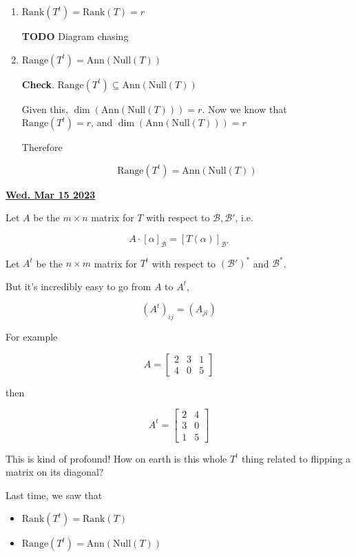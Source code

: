 \documentclass[12pt]{article}
\newcommand{\rank}{\mathrm{Rank}}
\def\Ann{\text{Ann}}
\def\B{\mathcal B}
\renewcommand{\date}[1]{\underline{\bf #1}}
\def\range{\text{Range}}
\def\Null{\text{Null}}
\newcommand{\TODO}{\color{red}\textbf{TODO}\color{black}}
\begin{document}
{\begin{enumerate}
        So what we have is that, if $g$ is in the Null Space of $T^t$, it also
        must be in the Annihilator of the Range of $T$.

      \item $\rank(T^t) = \rank(T) = r$ 

        \TODO{} Diagram chasing

      \item $\range(T^t) = \Ann(\Null(T))$

        {\bf Check}. $\range(T^t) \subseteq \Ann(\Null(T))$

        Given this, $\dim(\Ann(\Null(T))) = r$. Now we know that $\range(T^t) =
        r$, and $\dim(\Ann(\Null(T))) = r$

        Therefore

        \[
          \range(T^t) = \Ann(\Null(T))
        \]
    \end{enumerate}
  }

  \date{Wed. Mar 15 2023}

  Let $A$ be the $m \times n$ matrix for $T$ with respect to $\B, \B'$, i.e.

  \[
    A \cdot [\alpha]_{\B} = [T(\alpha)]_{\B'}
  \]

  Let $A^t$ be the $n \times m$ matrix for $T^t$ with respect to
  $\left(\B'\right)^*$ and $\B^*$.

  But it's incredibly easy to go from $A$ to $A^t$,

  \[
    \left(A^t\right)_{ij} = \left(A_{ji}\right)
  \]

  For example

  \[
    A = \begin{bmatrix}
      2 & 3 & 1 \\
      4 & 0 & 5
    \end{bmatrix}
  \]

  then

  \[
    A^t = \begin{bmatrix}
      2 & 4 \\
      3 & 0 \\
      1 & 5
    \end{bmatrix}
  \]

  This is kind of profound! How on earth is this whole $T^t$ thing related to
  flipping a matrix on its diagonal?


  Last time, we saw that

  \begin{itemize}
    \item $\rank(T^t) = \rank(T)$
    \item $\range(T^t) = \Ann(\Null(T))$
  \end{itemize}
\end{document}
